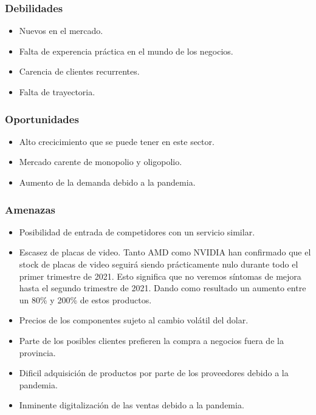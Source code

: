 \documentclass[11pt,a4paper]{article}
\begin{document}
\subsubsection{Debilidades} 
\begin{itemize}
    \item Nuevos en el mercado.
    \item Falta de experencia práctica en el mundo de los negocios.
    \item Carencia de clientes recurrentes.
    \item Falta de trayectoria.
\end{itemize}

\subsubsection{Oportunidades}
\begin{itemize}
    \item Alto crecicimiento que se puede tener en este sector.
    \item Mercado carente de monopolio y oligopolio.
    \item Aumento de la demanda debido a la pandemia.
\end{itemize}

\subsubsection{Amenazas}
\begin{itemize}
    \item Posibilidad de entrada de competidores con un servicio similar.   
    \item Escasez de placas de video. Tanto AMD como NVIDIA han confirmado que el stock de placas de video seguirá siendo prácticamente nulo durante todo el primer trimestre de 2021. Esto significa que no veremos síntomas de mejora hasta el segundo trimestre de 2021. Dando como resultado un aumento entre un 80\% y 200\% de estos productos.
    \item Precios de los componentes sujeto al cambio volátil del dolar.
    \item Parte de los posibles clientes prefieren la compra a negocios fuera de la provincia.
    \item Dificil adquisición de productos por parte de los proveedores debido a la pandemia.
    \item Inminente digitalización de las ventas debido a la pandemia.
    
\end{itemize}
\end{document}
